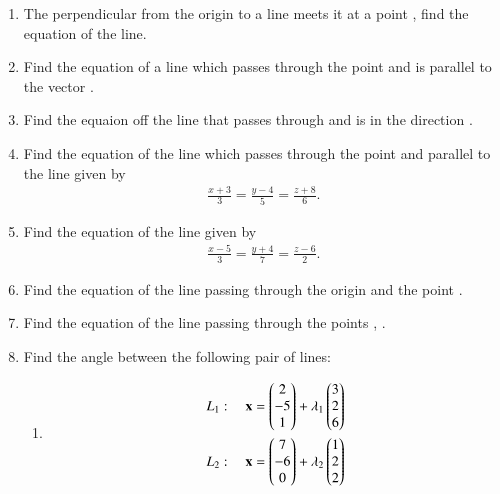 \begin{enumerate}[label=\arabic*.,ref=\thesubsection.\theenumi]
\item The perpendicular from the origin to a line meets it at a point , find the equation of the line.
\item Find the equation of a line which passes through the point  and is parallel to the vector .
\item Find the equaion off the line that passes through  and is in the direction .
\item Find the equation of the line which passes through  the point  and parallel to the line given by 
\begin{align}
\frac{x+3}{3} = \frac{y-4}{5} = \frac{z+8}{6}. 
\end{align}
\item Find the equation of the line given by 
\begin{align}
\frac{x-5}{3} = \frac{y+4}{7} = \frac{z-6}{2}. 
\end{align}
\item Find the equation of the line passing through the origin and the point .
\item Find the equation of the line passing through the points , .
\item Find the angle between the following pair of lines:
\begin{enumerate}
\item
\begin{align}
L_1: \quad \vec{x} &= \myvec{2\\-5\\1} + \lambda_1\myvec{3 \\ 2 \\6}
\\
L_2: \quad \vec{x} &= \myvec{7\\-6\\0} + \lambda_2\myvec{1 \\ 2 \\2}

\end{align}
\end{enumerate}
\end{enumerate}
